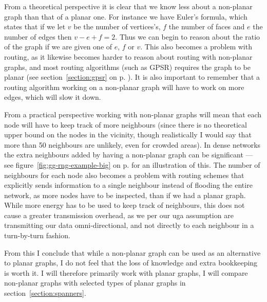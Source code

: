 From a theoretical perspective it is clear that we know less about a non-planar graph than that of a planar one. For instance we have Euler's formula, which states that if we let $v$ be the number of vertices's, $f$ the number of faces and $e$ the number of edges then $v - e + f = 2$. Thus we can begin to reason about the ratio of the graph if we are given one of $e$, $f$ or $v$. This also becomes a problem with routing, as it likewise becomes harder to reason about routing with non-planar graphs, and most routing algorithms (such as GPSR) requires the graph to be planar (see section~\ref{section:gpsr} on p. \pageref{section:gpsr}). It is also important to remember that a routing algorithm working on a non-planar graph will have to work on more edges, which will slow it down.

From a practical perspective working with non-planar graphs will mean that each node will have to keep track of more neighbours (since there is no theoretical upper bound on the nodes in the vicinity, though realistically I would say that more than 50 neighbours are unlikely, even for crowded areas). In dense networks the extra neighbours added by having a non-planar graph can be significant --- see figure~\ref{fig:gg-rng-example-big} on p. \pageref{fig:gg-rng-example-big} for an illustration of this. The number of neighbours for each node also becomes a problem with routing schemes that explicitly sends information to a single neighbour instead of flooding the entire network, as more nodes have to be inspected, than if we had a planar graph. While more energy has to be used to keep track of neighbours, this does not cause a greater transmission overhead, as we per our \ac{uga} assumption are transmitting our data omni-directional, and not directly to each neighbour in a turn-by-turn fashion.

From this I conclude that while a non-planar graph can be used as an alternative to planar graphs, I do not feel that the loss of knowledge and extra bookkeeping is worth it. I will therefore primarily work with planar graphs, I will compare non-planar graphs with selected types of planar graphs in section~\ref{section:spanners}.
 
